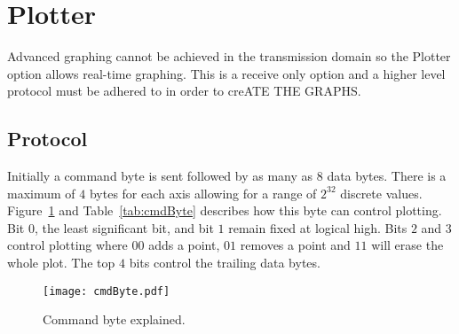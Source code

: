 \section{Plotter}


Advanced graphing cannot be achieved in the transmission domain so the \ds Plotter option allows real-time graphing.
This is a receive only option and a higher level protocol must be adhered to in order to creATE THE GRAPHS. 

\subsection{Protocol}

Initially a command byte is sent followed by as many as $8$ data bytes.
There is a maximum of $4$ bytes for each axis allowing for a range of $2^{32}$ discrete values.
Figure~\ref{fig:cmdByte} and Table~\ref{tab:cmdByte} describes how this byte can control plotting.
Bit $0$, the least significant bit, and bit $1$ remain fixed at logical high.
Bits $2$ and $3$ control plotting where $00$ adds a point, $01$ removes a point and $11$ will erase the whole plot.
The top $4$ bits control the trailing data bytes.

\begin{figure}[h]
   \centering
   \texttt{[image: cmdByte.pdf]}
   \caption{Command byte explained.}
   \label{fig:cmdByte}
\end{figure}


